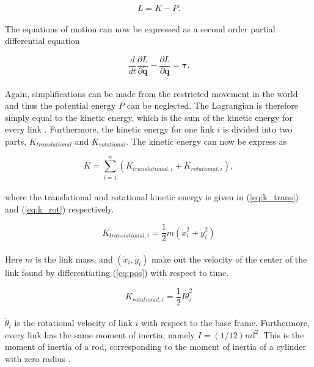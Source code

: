 \begin{equation}
    L = K - P.
\end{equation}
\\
The equations of motion can now be expressed as a second order partial differential equation

\begin{equation} \label{eq:Lagrange}
    \frac{d}{d t} \frac{\partial L}{\partial \mathbf{\dot{q}}} - \frac{\partial L}{\partial \mathbf{q}} = \boldsymbol{\tau}.
\end{equation}
\\
Again, simplifications can be made from the restricted movement in the world and thus the potential energy $P$ can be neglected. The Lagrangian is therefore simply equal to the kinetic energy, which is the sum of the kinetic energy for every link \cite{rezapour2014path}. Furthermore, the kinetic energy for one link $i$ is divided into two parts, $K_{translational}$ and $K_{rotational}$.
The kinetic energy can now be express as

\begin{equation}\label{eq:kinen}
    K = \sum_{i=1}^{n} (K_{translational,i} + K_{rotational,i}),
\end{equation}
\\
where the translational and rotational kinetic energy is given in (\ref{eq:k_trans}) and (\ref{eq:k_rot}) respectively.

\begin{equation} \label{eq:k_trans}
    K_{translational,i} = \frac{1}{2} m (\dot{x}_i^2 + \dot{y}_i^2)
\end{equation}
\\
Here $m$ is the link mass, and $(\dot{x}_i, \dot{y}_i)$ make out the velocity of the center of the link found by differentiating (\ref{eq:pos}) with respect to time. 

\begin{equation} \label{eq:k_rot}
    K_{rotational,i} = \frac{1}{2}I\dot{\theta}_i^2
\end{equation}
\\
$\dot{\theta}_{i}$ is the rotational velocity of link $i$ with respect to the base frame. Furthermore, every link has the same moment of inertia, namely $I = (1/12)ml^2$. This is the moment of inertia of a rod, corresponding to the moment of inertia of a cylinder with zero radius \cite{lynch2017modern}.





